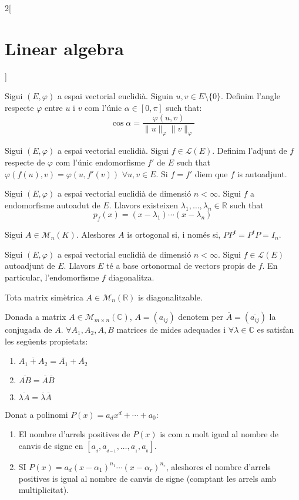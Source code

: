 \documentclass[../../../main.tex]{subfiles}
\begin{document}
\begin{multicols}{2}[\section{Linear algebra}]
\begin{definition}
Sigui $(E,\varphi)$ a espai vectorial euclidià. Siguin $u,v\in E\setminus\{0\}$. Definim l'angle respecte $\varphi$ entre $u$ i $v$ com l'únic $\alpha\in[0,\pi]$ such that: $$\cos{\alpha}=\frac{\varphi(u,v)}{\|u\|_\varphi\|v\|_\varphi}$$
\end{definition}
\begin{definition}
Sigui $(E,\varphi)$ a espai vectorial euclidià. Sigui $f\in\mathcal{L}(E)$. Definim l'adjunt de $f$ respecte de $\varphi$ com l'únic endomorfisme $f'$ de $E$ such that $\varphi(f(u),v)=\varphi(u,f'(v))$ $\forall u,v\in E$. Si $f=f'$ diem que $f$ is autoadjunt. 
\end{definition}
\begin{lemma}
Sigui $(E,\varphi)$ a espai vectorial euclidià de dimensió $n<\infty$. Sigui $f$ a endomorfisme autoadut de $E$. Llavors existeixen $\lambda_1,\ldots,\lambda_n\in\mathbb{R}$ such that $$p_f(x)=(x-\lambda_1 )\cdots(x-\lambda_n)$$
\end{lemma}
\begin{definition}
Sigui $A\in\mathcal{M}_n(K)$. Aleshores $A$ is ortogonal si, i només si, $PP^t=P^tP=I_n$.
\end{definition}
\begin{theorem}
Sigui $(E,\varphi)$ a espai vectorial euclidià de dimensió $n<\infty$. Sigui $f\in\mathcal{L}(E)$ autoadjunt de $E$. Llavors $E$ té a base ortonormal de vectors propis de $f$. En particular, l’endomorfisme $f$ diagonalitza.
\end{theorem}
\begin{corollary}
Tota matrix simètrica $A\in\mathcal{M}_n(\mathbb{R})$ is diagonalitzable.
\end{corollary}
\begin{definition}
Donada a matrix $A\in\mathcal{M}_{m\times n}(\mathbb{C})$, $A=(a_{ij})$ denotem per $\overline{A}=(\overline{a_{ij}})$ la conjugada de $A$. $\forall A_1,A_2,A,B$ matrices de mides adequades i $\forall\lambda\in\mathbb{C}$ es satisfan les següents propietats:
\begin{enumerate}
    \item $\overline{A_1+A_2}=\overline{
    A_1}+\overline{A_2}$
    \item $\overline{AB}=\overline{
    A}\overline{B}$
    \item $\overline{\lambda A}=\overline{\lambda}\overline{A}$
\end{enumerate}
\end{definition}
\begin{theorem}
Donat a polinomi $P(x)=a_dx^d+\cdots+a_0$:
\begin{enumerate}
    \item El nombre d'arrels positives de $P(x)$ is com a molt igual al nombre de canvis de signe en $[a_{\!_d},a_{\!_{d-1}},\ldots,a_{\!_1},a_{\!_0}]$.
    \item SI $P(x)=a_d(x-\alpha_1)^{n_1}\cdots(x-\alpha_r)^{n_r}$, aleshores el nombre d'arrels positives is igual al nombre de canvis de signe (comptant les arrels amb multiplicitat).
\end{enumerate}
\end{theorem}
\end{multicols}
\end{document}
